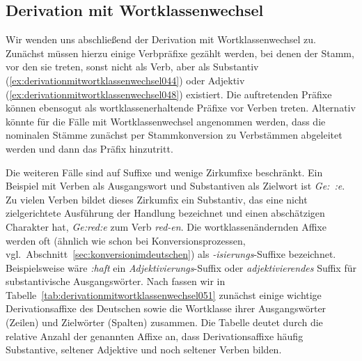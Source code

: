 \subsection{Derivation mit Wortklassenwechsel}
\label{sec:derivationmitwortklassenwechsel}


Wir wenden uns abschließend der Derivation mit Wortklassenwechsel zu.
Zunächst müssen hierzu einige Verbpräfixe gezählt werden, bei denen der Stamm, vor den sie treten, sonst nicht als Verb, aber als Substantiv (\ref{ex:derivationmitwortklassenwechsel044}) oder Adjektiv (\ref{ex:derivationmitwortklassenwechsel048}) existiert.
Die auftretenden Präfixe können \idR ebensogut als wortklassenerhaltende Präfixe vor Verben treten.
Alternativ könnte für die Fälle mit Wortklassenwechsel angenommen werden, dass die nominalen Stämme zunächst per Stammkonversion zu Verbstämmen abgeleitet werden und dann das Präfix hinzutritt.

\begin{exe}
  \ex\label{ex:derivationmitwortklassenwechsel044}
  \begin{xlist}
  \end{xlist}
  \ex\label{ex:derivationmitwortklassenwechsel048}
  \begin{xlist}
  \end{xlist}
\end{exe}

Die weiteren Fälle sind auf Suffixe und wenige Zirkumfixe beschränkt.
Ein Beispiel mit Verben als Ausgangswort und Substantiven als Zielwort ist \textit{Ge:~:e}.
Zu vielen Verben bildet dieses Zirkumfix ein Substantiv, das eine nicht zielgerichtete Ausführung der Handlung bezeichnet und einen abschätzigen Charakter hat, \zB \textit{Ge:red:e} zum Verb \textit{red-en}.
Die wortklassenändernden Affixe werden oft (ähnlich wie schon bei Konversionsprozessen, vgl.\ Abschnitt~\ref{sec:konversionimdeutschen}) als \textit{-isierungs}-Suffixe bezeichnet.
Beispielsweise wäre \textit{:haft} ein \textit{Adjektivierungs}-Suffix oder \textit{adjektivierendes} Suffix für substantivische Ausgangswörter.
Nach \citet[267]{Eisenberg2013a} fassen wir in Tabelle~\ref{tab:derivationmitwortklassenwechsel051} zunächst einige wichtige Derivationsaffixe des Deutschen sowie die Wortklasse ihrer Ausgangswörter (Zeilen) und Zielwörter (Spalten) zusammen.
Die Tabelle deutet durch die relative Anzahl der genannten Affixe an, dass Derivationsaffixe häufig Substantive, seltener Adjektive und noch seltener Verben bilden.

